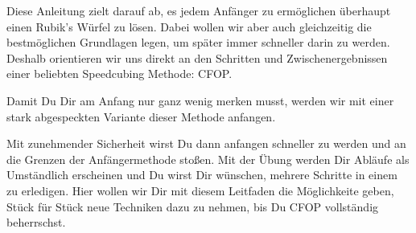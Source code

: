 Diese Anleitung zielt darauf ab, es jedem Anfänger zu ermöglichen überhaupt einen Rubik's Würfel zu lösen.
Dabei wollen wir aber auch gleichzeitig die bestmöglichen Grundlagen legen, um später immer schneller darin zu werden.
Deshalb orientieren wir uns direkt an den Schritten und Zwischenergebnissen einer beliebten Speedcubing Methode: CFOP.

Damit Du Dir am Anfang nur ganz wenig merken musst, werden wir mit einer stark abgespeckten Variante dieser Methode anfangen.

Mit zunehmender Sicherheit wirst Du dann anfangen schneller zu werden und an die Grenzen der Anfängermethode stoßen.
Mit der Übung werden Dir Abläufe als Umständlich erscheinen und Du wirst Dir wünschen, mehrere Schritte in einem zu erledigen.
Hier wollen wir Dir mit diesem Leitfaden die Möglichkeite geben, Stück für Stück neue Techniken dazu zu nehmen, bis Du CFOP vollständig beherrschst.

